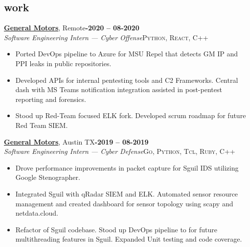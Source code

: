 \documentclass[margin,10pt]{res}
\begin{document}
\begin{resume}
\section{\sc \lsstyle work}
    \href{https://www.gm.com/}{\textbf{General Motors}}, Remote\hfill \textsc{\bfseries{}-2020 -- 08-2020}\\
    \textit{Software Engineering Intern --- Cyber Offense}\hfill \textsc{Python, React, C++}
    \vspace{0.5em}
    \begin{itemize}
        \item Ported DevOps pipeline to Azure for MSU Repel that detects GM IP and PPI leaks in public repositories.
        \item Developed APIs for internal pentesting tools and C2 Frameworks. Central dash with MS Teams notification integration assisted in post-pentest reporting and forensics. 
        \item Stood up Red-Team focused ELK fork. Developed scrum roadmap for future Red Team SIEM.
    \end{itemize}

    \href{https://www.gm.com/}{\textbf{General Motors}}, Austin TX\hfill \textsc{\bfseries{}-2019 -- 08-2019}\\
    \textit{Software Engineering Intern --- Cyber Defense}\hfill \textsc{Go, Python, Tcl, Ruby, C++}
    \vspace{0.5em}
    \begin{itemize}
        \item Drove performance improvements in packet capture for Sguil IDS utilizing Google Stenographer. 
        \item Integrated Sguil with qRadar SIEM and ELK. Automated sensor resource management and created dashboard for sensor topology using scapy and netdata.cloud.
        \item Refactor of Sguil codebase. Stood up DevOps pipeline to for future multithreading features in Sguil. Expanded Unit testing and code coverage.
    \end{itemize}


\end{resume}
\end{document}
